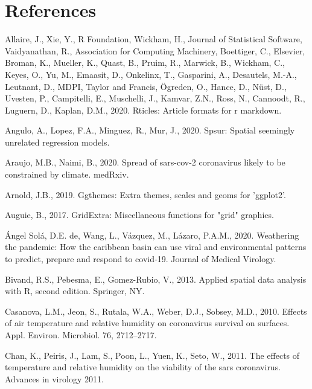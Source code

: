 \documentclass[]{elsarticle} %
\begin{document}
\hypertarget{references}{%
\section*{References}\label{references}}

\hypertarget{refs}{}
\leavevmode\hypertarget{ref-Allaire2020}{}%
Allaire, J., Xie, Y., R Foundation, Wickham, H., Journal of Statistical
Software, Vaidyanathan, R., Association for Computing Machinery,
Boettiger, C., Elsevier, Broman, K., Mueller, K., Quast, B., Pruim, R.,
Marwick, B., Wickham, C., Keyes, O., Yu, M., Emaasit, D., Onkelinx, T.,
Gasparini, A., Desautels, M.-A., Leutnant, D., MDPI, Taylor and Francis,
Ögreden, O., Hance, D., Nüst, D., Uvesten, P., Campitelli, E.,
Muschelli, J., Kamvar, Z.N., Ross, N., Cannoodt, R., Luguern, D.,
Kaplan, D.M., 2020. Rticles: Article formats for r markdown.

\leavevmode\hypertarget{ref-Angulo2020spsur}{}%
Angulo, A., Lopez, F.A., Minguez, R., Mur, J., 2020. Spsur: Spatial
seemingly unrelated regression models.

\leavevmode\hypertarget{ref-Araujo2020spread}{}%
Araujo, M.B., Naimi, B., 2020. Spread of sars-cov-2 coronavirus likely
to be constrained by climate. medRxiv.

\leavevmode\hypertarget{ref-Arnold2019}{}%
Arnold, J.B., 2019. Ggthemes: Extra themes, scales and geoms for
'ggplot2'.

\leavevmode\hypertarget{ref-Auguie2017gridextra}{}%
Auguie, B., 2017. GridExtra: Miscellaneous functions for "grid"
graphics.

\leavevmode\hypertarget{ref-deangel2020weathering}{}%
Ángel Solá, D.E. de, Wang, L., Vázquez, M., Lázaro, P.A.M., 2020.
Weathering the pandemic: How the caribbean basin can use viral and
environmental patterns to predict, prepare and respond to covid‐19.
Journal of Medical Virology.

\leavevmode\hypertarget{ref-Bivand2013}{}%
Bivand, R.S., Pebesma, E., Gomez-Rubio, V., 2013. Applied spatial data
analysis with R, second edition. Springer, NY.

\leavevmode\hypertarget{ref-Casanova2010effects}{}%
Casanova, L.M., Jeon, S., Rutala, W.A., Weber, D.J., Sobsey, M.D., 2010.
Effects of air temperature and relative humidity on coronavirus survival
on surfaces. Appl. Environ. Microbiol. 76, 2712--2717.

\leavevmode\hypertarget{ref-Chan2011effects}{}%
Chan, K., Peiris, J., Lam, S., Poon, L., Yuen, K., Seto, W., 2011. The
effects of temperature and relative humidity on the viability of the
sars coronavirus. Advances in virology 2011.
\end{document}
